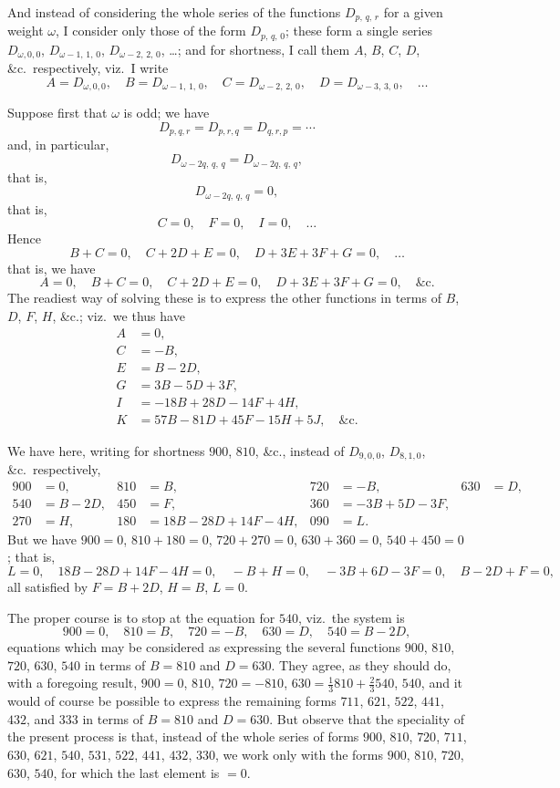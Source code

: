 \documentclass[11pt,a4paper]{book}
\begin{document}
And instead of considering the whole series of the functions $D_{p,\,q,\,r}$ for a given weight $\omega$, I consider only those of the form $D_{p,\,q,\,0}$; these form a single series $D_{\omega,0,0}$, $D_{\omega-1,\,1,\,0}$, $D_{\omega-2,\,2,\,0}$, \ldots; and for shortness, I call them $A$, $B$, $C$, $D$, \&c.\ respectively, viz.\ I write
\[
A = D_{\omega,0,0}, \quad B = D_{\omega-1,\,1,\,0}, \quad C = D_{\omega-2,\,2,\,0}, \quad D = D_{\omega-3,\,3,\,0}, \quad \ldots
\]

Suppose first that $\omega$ is odd; we have
\[
D_{p,q,r} = D_{p,r,q} = D_{q,r,p} = \cdots
\]
and, in particular,
\[
D_{\omega-2q,\,q,\,q} = D_{\omega-2q,\,q,\,q},
\]
that is,
\[
D_{\omega-2q,\,q,\,q} = 0,
\]
that is,
\[
C = 0, \quad F = 0, \quad I = 0, \quad \ldots
\]
Hence
\[
B + C = 0, \quad C + 2D + E = 0, \quad D + 3E + 3F + G = 0, \quad \ldots
\]
that is, we have
\[
A = 0, \quad B + C = 0, \quad C + 2D + E = 0, \quad D + 3E + 3F + G = 0, \quad \text{\&c.}
\]
The readiest way of solving these is to express the other functions in terms of $B$, $D$, $F$, $H$, \&c.; viz.\ we thus have
\begin{align*}
A &= 0,\\
C &= -B,\\
E &= B - 2D,\\
G &= 3B - 5D + 3F,\\
I &= -18B + 28D - 14F + 4H,\\
K &= 57B - 81D + 45F - 15H + 5J, \quad \text{\&c.}
\end{align*}

We have here, writing for shortness $900$, $810$, \&c., instead of $D_{9,0,0}$, $D_{8,1,0}$, \&c.\ respectively,
\begin{align*}
900 &= 0, & 810 &= B, & 720 &= -B, & 630 &= D,\\
540 &= B - 2D, & 450 &= F, & 360 &= -3B + 5D - 3F,\\
270 &= H, & 180 &= 18B - 28D + 14F - 4H, & 090 &= L.
\end{align*}
But we have $900 = 0$, $810 + 180 = 0$, $720 + 270 = 0$, $630 + 360 = 0$, $540 + 450 = 0$; that is,
\[
L = 0, \quad 18B - 28D + 14F - 4H = 0, \quad -B + H = 0, \quad -3B + 6D - 3F = 0, \quad B - 2D + F = 0,
\]
all satisfied by $F = B + 2D$, $H = B$, $L = 0$.

The proper course is to stop at the equation for $540$, viz.\ the system is
\[
900 = 0, \quad 810 = B, \quad 720 = -B, \quad 630 = D, \quad 540 = B - 2D,
\]
equations which may be considered as expressing the several functions $900$, $810$, $720$, $630$, $540$ in terms of $B = 810$ and $D = 630$. They agree, as they should do, with a foregoing result, $900 = 0$, $810$, $720 = -810$, $630 = \frac{1}{3}810 + \frac{2}{3}540$, $540$, and it would of course be possible to express the remaining forms $711$, $621$, $522$, $441$, $432$, and $333$ in terms of $B = 810$ and $D = 630$. But observe that the speciality of the present process is that, instead of the whole series of forms $900$, $810$, $720$, $711$, $630$, $621$, $540$, $531$, $522$, $441$, $432$, $330$, we work only with the forms $900$, $810$, $720$, $630$, $540$, for which the last element is $= 0$.
\end{document}
